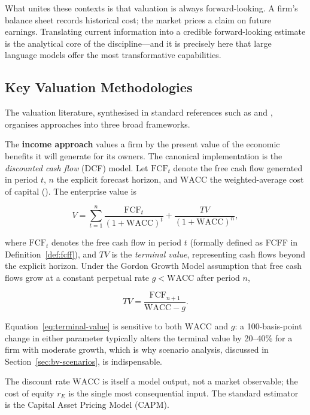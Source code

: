 \begin{context}
What unites these contexts is that valuation is always forward-looking. A firm's
balance sheet records historical cost; the market prices a claim on future earnings.
Translating current information into a credible forward-looking estimate is the
analytical core of the discipline---and it is precisely here that large language models
offer the most transformative capabilities.

\subsection{Key Valuation Methodologies}
\label{subsec:bv-intro-methodologies}

The valuation literature, synthesised in standard references such as \citet{damodaran2012investment}
and \citet{berk2020corporate}, organises approaches into three broad frameworks.

The \textbf{income approach} values a firm by the present value of the economic benefits
it will generate for its owners. The canonical implementation is the
\emph{discounted cash flow} (DCF) model. Let $\mathrm{FCF}_t$ denote the free cash
flow generated in period $t$, $n$ the explicit forecast horizon, and $\mathrm{WACC}$
the weighted-average cost of capital (). The enterprise value is

\begin{equation}
\label{eq:dcf}
V = \sum_{t=1}^{n} \frac{\mathrm{FCF}_t}{(1+\mathrm{WACC})^t}
    + \frac{TV}{(1+\mathrm{WACC})^n},
\end{equation}

where $\mathrm{FCF}_t$ denotes the free cash flow in period $t$ (formally defined as FCFF in Definition~\ref{def:fcff}), and $TV$ is the \emph{terminal value}, representing cash flows beyond the explicit
horizon. Under the Gordon Growth Model assumption that free cash flows grow at a
constant perpetual rate $g < \mathrm{WACC}$ after period $n$,

\begin{equation}
\label{eq:terminal-value}
TV = \frac{\mathrm{FCF}_{n+1}}{\mathrm{WACC} - g}.
\end{equation}

Equation~\eqref{eq:terminal-value} is sensitive to both $\mathrm{WACC}$ and $g$: a
100-basis-point change in either parameter typically alters the terminal value by
20--40\% for a firm with moderate growth, which is why scenario analysis, discussed
in Section~\ref{sec:bv-scenarios}, is indispensable.

The discount rate $\mathrm{WACC}$ is itself a model output, not a market observable; the
cost of equity $r_E$ is the single most consequential input. The standard estimator is
the Capital Asset Pricing Model (CAPM).


\end{context}
